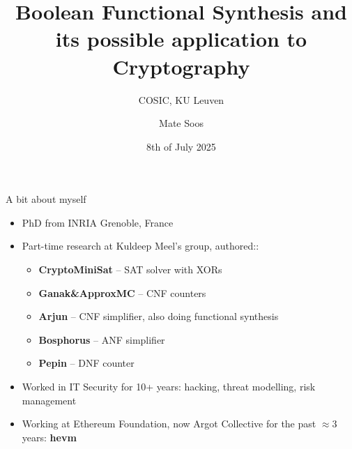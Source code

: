 \documentclass[aspectratio=169]{beamer}
\title[Func. Synthesis]{
Boolean Functional Synthesis and its possible application to Cryptography}
\author[Soos]{Mate Soos}
\institute[Argot]{\large Argot Collective (\url{https://argot.org})}
\date{8th of July 2025}
\subtitle{COSIC, KU Leuven}
\begin{document}
\begin{frame}
    \titlepage
\end{frame}

\begin{frame}{A bit about myself}
\begin{itemize}
\item PhD from INRIA Grenoble, France
\item Part-time research at Kuldeep Meel's group, authored::
    \begin{itemize}
        \item \textbf{CryptoMiniSat} -- SAT solver with XORs
        \item \textbf{Ganak\&ApproxMC} -- CNF counters
        \item \textbf{Arjun} -- CNF simplifier, also doing functional synthesis
        \item \textbf{Bosphorus} -- ANF simplifier
        \item \textbf{Pepin} -- DNF counter
    \end{itemize}
\item Worked in IT Security for 10+ years: hacking,
    threat modelling, risk management
\item Working at Ethereum Foundation, now Argot Collective for the past $\approx3$
    years: \textbf{hevm}
\end{itemize}
\end{frame}

\end{document}
